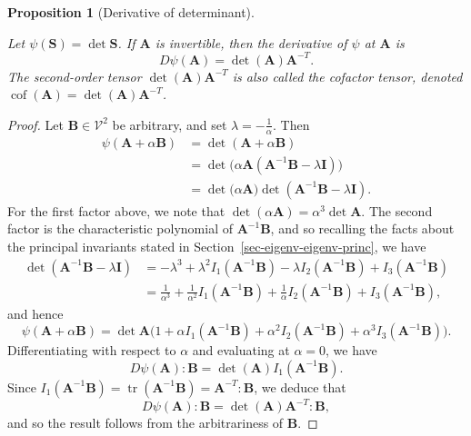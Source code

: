\documentclass[
  letterpaper,
  DIV=11,
  numbers=noendperiod]{scrreprt}
\theoremstyle{plain}
\newtheorem{proposition}{Proposition}[chapter]
\theoremstyle{remark}
\begin{document}
\begin{proposition}[Derivative of
determinant]\protect\hypertarget{prp-derivativedet}{}\label{prp-derivativedet}

Let \(\psi({\boldsymbol{S}}) = \det{\boldsymbol{S}}\). If
\({\boldsymbol{A}}\) is invertible, then the derivative of \(\psi\) at
\({\boldsymbol{A}}\) is
\[D\psi({\boldsymbol{A}}) = \det({\boldsymbol{A}}){\boldsymbol{A}}^{-T}.\]
The second-order tensor \(\det({\boldsymbol{A}}){\boldsymbol{A}}^{-T}\)
is also called the \emph{cofactor} tensor, denoted
\({\operatorname{cof}}({\boldsymbol{A}})=\det({\boldsymbol{A}}){\boldsymbol{A}}^{-T}\).

\end{proposition}

\begin{proof}
Let \({\boldsymbol{B}}\in{\mathcal{V}}^2\) be arbitrary, and set
\(\lambda = -\tfrac1\alpha\). Then \[\begin{aligned}
    \psi({\boldsymbol{A}}+\alpha{\boldsymbol{B}})
    &= \det({\boldsymbol{A}}+\alpha{\boldsymbol{B}})\\
    &= \det\big(\alpha{\boldsymbol{A}}({\boldsymbol{A}}^{-1}{\boldsymbol{B}}-\lambda{\boldsymbol{I}})\big)\\
    &= \det\big(\alpha{\boldsymbol{A}})\det({\boldsymbol{A}}^{-1}{\boldsymbol{B}}-\lambda{\boldsymbol{I}}).
\end{aligned}\] For the first factor above, we note that
\(\det(\alpha{\boldsymbol{A}}) = \alpha^3\det {\boldsymbol{A}}\). The
second factor is the characteristic polynomial of
\({\boldsymbol{A}}^{-1}{\boldsymbol{B}}\), and so recalling the facts
about the principal invariants stated in
Section~\ref{sec-eigenv-eigenv-princ}, we have \[
\begin{aligned}
    \det({\boldsymbol{A}}^{-1}{\boldsymbol{B}}-\lambda{\boldsymbol{I}})
    &=-\lambda^3+\lambda^2I_1({\boldsymbol{A}}^{-1}{\boldsymbol{B}})-\lambda I_2({\boldsymbol{A}}^{-1}{\boldsymbol{B}})+I_3({\boldsymbol{A}}^{-1}{\boldsymbol{B}})\\
    &=\frac{1}{\alpha^3}+\frac{1}{\alpha^2}I_1({\boldsymbol{A}}^{-1}{\boldsymbol{B}})+\frac1\alpha I_2({\boldsymbol{A}}^{-1}{\boldsymbol{B}})+I_3({\boldsymbol{A}}^{-1}{\boldsymbol{B}}),
\end{aligned}
\] and hence
\[\psi({\boldsymbol{A}}+\alpha{\boldsymbol{B}}) =  \det{\boldsymbol{A}}\big(1+\alpha I_1({\boldsymbol{A}}^{-1}{\boldsymbol{B}})+\alpha^2 I_2({\boldsymbol{A}}^{-1}{\boldsymbol{B}})+\alpha^3 I_3({\boldsymbol{A}}^{-1}{\boldsymbol{B}})\big).\]
Differentiating with respect to \(\alpha\) and evaluating at
\(\alpha=0\), we have
\[D\psi({\boldsymbol{A}}):{\boldsymbol{B}}= \det({\boldsymbol{A}})I_1({\boldsymbol{A}}^{-1}{\boldsymbol{B}}).\]
Since
\(I_1({\boldsymbol{A}}^{-1}{\boldsymbol{B}}) = {\operatorname{tr}}({\boldsymbol{A}}^{-1}{\boldsymbol{B}}) = {\boldsymbol{A}}^{-T}:{\boldsymbol{B}}\),
we deduce that
\[D\psi({\boldsymbol{A}}):{\boldsymbol{B}}= \det({\boldsymbol{A}}){\boldsymbol{A}}^{-T}:{\boldsymbol{B}},\]
and so the result follows from the arbitrariness of
\({\boldsymbol{B}}\).
\end{proof}
\end{document}
